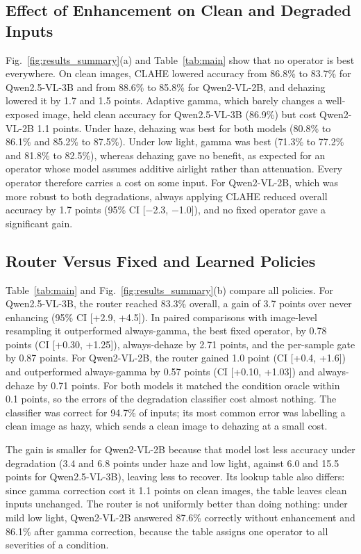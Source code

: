 \documentclass[lettersize,journal]{IEEEtran}
\begin{document}
\subsection{Effect of Enhancement on Clean and Degraded Inputs}

Fig.~\ref{fig:results_summary}(a) and Table~\ref{tab:main} show that no operator is best everywhere. On clean images, CLAHE lowered accuracy from 86.8\% to 83.7\% for Qwen2.5-VL-3B and from 88.6\% to 85.8\% for Qwen2-VL-2B, and dehazing lowered it by 1.7 and 1.5 points. Adaptive gamma, which barely changes a well-exposed image, held clean accuracy for Qwen2.5-VL-3B (86.9\%) but cost Qwen2-VL-2B 1.1 points. Under haze, dehazing was best for both models (80.8\% to 86.1\% and 85.2\% to 87.5\%). Under low light, gamma was best (71.3\% to 77.2\% and 81.8\% to 82.5\%), whereas dehazing gave no benefit, as expected for an operator whose model assumes additive airlight rather than attenuation. Every operator therefore carries a cost on some input. For Qwen2-VL-2B, which was more robust to both degradations, always applying CLAHE reduced overall accuracy by 1.7 points (95\% CI [$-$2.3, $-$1.0]), and no fixed operator gave a significant gain.

\subsection{Router Versus Fixed and Learned Policies}

Table~\ref{tab:main} and Fig.~\ref{fig:results_summary}(b) compare all policies. For Qwen2.5-VL-3B, the router reached 83.3\% overall, a gain of 3.7 points over never enhancing (95\% CI [+2.9, +4.5]). In paired comparisons with image-level resampling it outperformed always-gamma, the best fixed operator, by 0.78 points (CI [+0.30, +1.25]), always-dehaze by 2.71 points, and the per-sample gate by 0.87 points. For Qwen2-VL-2B, the router gained 1.0 point (CI [+0.4, +1.6]) and outperformed always-gamma by 0.57 points (CI [+0.10, +1.03]) and always-dehaze by 0.71 points. For both models it matched the condition oracle within 0.1 points, so the errors of the degradation classifier cost almost nothing. The classifier was correct for 94.7\% of inputs; its most common error was labelling a clean image as hazy, which sends a clean image to dehazing at a small cost.

The gain is smaller for Qwen2-VL-2B because that model lost less accuracy under degradation (3.4 and 6.8 points under haze and low light, against 6.0 and 15.5 points for Qwen2.5-VL-3B), leaving less to recover. Its lookup table also differs: since gamma correction cost it 1.1 points on clean images, the table leaves clean inputs unchanged. The router is not uniformly better than doing nothing: under mild low light, Qwen2-VL-2B answered 87.6\% correctly without enhancement and 86.1\% after gamma correction, because the table assigns one operator to all severities of a condition.
\end{document}
